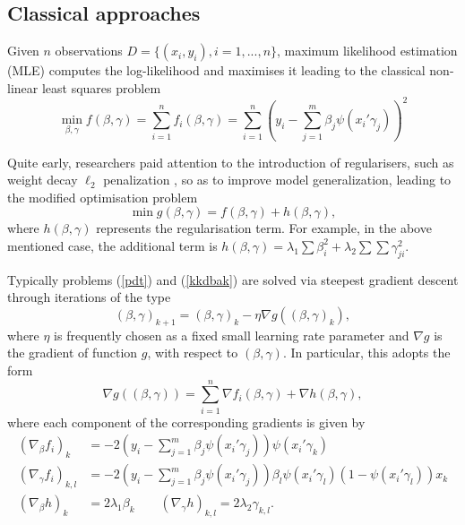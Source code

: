 \subsection{Classical approaches}\label{sanchez}

Given $n$ observations $D=\{ (x_i, y_i), i=1,...,n \}$,
 maximum likelihood estimation (MLE) 
 computes the log-likelihood and maximises it 
leading to the classical non-linear least squares problem
\begin{equation}\label{pdt}
 \min_{\beta , \gamma } f (\beta , \gamma) = \sum _{i=1}^n f_i(\beta, \gamma)  =\sum _{i=1}^n \left( y_i -
  \sum_{j=1}^m \beta_j \psi(x_i'\gamma_j) \right)^2 
 \end{equation}

\noindent Quite early, researchers paid attention to the introduction of regularisers, such as weight decay $\ell_2$ penalization \cite{krogh1992simple}, so as to improve model 
generalization, leading to the modified optimisation problem
\begin{equation}\label{kkdbak}
 \min  g(\beta ,\gamma) = f (\beta ,\gamma ) +
 h (\beta ,\gamma ), \end{equation}
where $h(\beta , \gamma )$ represents the regularisation 
term. For example, in the above mentioned case, the 
additional term is  
$h(\beta , \gamma )= \lambda _1 \sum \beta_i ^2 +
\lambda _2 \sum \sum \gamma _{ji} ^2$. 

Typically problems (\ref{pdt}) and (\ref{kkdbak}) are solved via steepest gradient descent \cite{meza} through iterations of the type
\[
   (\beta, \gamma )_{k+1}=
   (\beta, \gamma )_{k}- \eta \nabla g (  (\beta, \gamma )_{k} ),
   \]
where $\eta $ is frequently chosen as a fixed small learning rate parameter and $\nabla g $ is the gradient of function $g$, with respect to 
$(\beta ,\gamma )$. In particular, this adopts the form 
\begin{equation}\label{gradiente1}
    \nabla g (  (\beta, \gamma )  )= \sum _{i=1}^n   \nabla f_i(\beta, \gamma) +  \nabla  h(\beta, \gamma),
    \end{equation}
    where each component of the corresponding gradients is given by 
\begin{align*}
(\nabla_\beta f_i)_k &= -2  \left(y_i - \sum_{j=1}^m \beta_j \psi(x_i' \gamma_j)\right) \psi(x_i' \gamma_k) \\
(\nabla_\gamma f_i)_{k,l} &= -2 \left (y_i - \sum_{j=1}^m \beta_j \psi(x_i' \gamma_j)\right) \beta_l \psi(x_i' \gamma_l)(1 - \psi(x_i' \gamma_l)) x_k \\
(\nabla_\beta h)_k &= 2\lambda_1 \beta_k  \qquad (\nabla_\gamma h)_{k,l} = 2\lambda_2 \gamma_{k,l}.
\end{align*}

